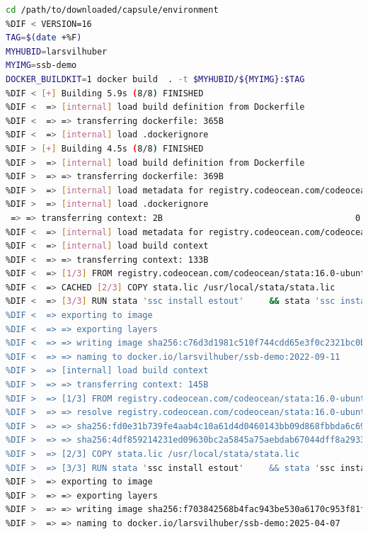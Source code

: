 \documentclass[inline]{hdsr} %
\providecommand{\DIFaddbegin}{} %
\providecommand{\DIFdelbegin}{} %
\providecommand{\DIFdelend}{} %
\providecommand{\DIFmodbegin}{} %
\begin{document}
\DIFdelbegin %
\DIFdelend \DIFaddbegin \DIFmodbegin
\begin{lstlisting}[language=bash,basicstyle=\footnotesize\color{NavyBlue}\ttfamily,caption={Building the container},float,label={code:build},alsolanguage=DIFcode]
cd /path/to/downloaded/capsule/environment
%DIF < VERSION=16
TAG=$(date +%F)
MYHUBID=larsvilhuber
MYIMG=ssb-demo
DOCKER_BUILDKIT=1 docker build  . -t $MYHUBID/${MYIMG}:$TAG
%DIF < [+] Building 5.9s (8/8) FINISHED                                                
%DIF <  => [internal] load build definition from Dockerfile                       0.0s
%DIF <  => => transferring dockerfile: 365B                                       0.0s
%DIF <  => [internal] load .dockerignore                                          0.0s
%DIF > [+] Building 4.5s (8/8) FINISHED                                   
%DIF >  => [internal] load build definition from Dockerfile                 0.1s
%DIF >  => => transferring dockerfile: 369B                                 0.0s
%DIF >  => [internal] load metadata for registry.codeocean.com/codeocean/s  1.1s
%DIF >  => [internal] load .dockerignore                                    0.1s
 => => transferring context: 2B                                      0.0s
%DIF <  => [internal] load metadata for registry.codeocean.com/codeocean/stata:1  0.0s
%DIF <  => [internal] load build context                                          0.0s
%DIF <  => => transferring context: 133B                                          0.0s
%DIF <  => [1/3] FROM registry.codeocean.com/codeocean/stata:16.0-ubuntu18.04     0.0s
%DIF <  => CACHED [2/3] COPY stata.lic /usr/local/stata/stata.lic                 0.0s
%DIF <  => [3/3] RUN stata 'ssc install estout'     && stata 'ssc install outreg  5.8s
%DIF <  => exporting to image                                                     0.0s 
%DIF <  => => exporting layers                                                    0.0s 
%DIF <  => => writing image sha256:c76d3d1981c510f744cdd65e3f0c2321bc0b7a99e5285  0.0s 
%DIF <  => => naming to docker.io/larsvilhuber/ssb-demo:2022-09-11                0.0s 
%DIF >  => [internal] load build context                                    0.1s
%DIF >  => => transferring context: 145B                                    0.0s
%DIF >  => [1/3] FROM registry.codeocean.com/codeocean/stata:16.0-ubuntu18  0.3s
%DIF >  => => resolve registry.codeocean.com/codeocean/stata:16.0-ubuntu18  0.0s
%DIF >  => => sha256:fd0e31b739fe4aab4c10a61d4d0460143bb09d868fbbda6c69848  0.0s
%DIF >  => => sha256:4df859214231ed09630bc2a5845a75aebdab67044dff8a2933b2e  0.0s
%DIF >  => [2/3] COPY stata.lic /usr/local/stata/stata.lic                  0.1s
%DIF >  => [3/3] RUN stata 'ssc install estout'     && stata 'ssc install   2.6s
%DIF >  => exporting to image                                               0.1s
%DIF >  => => exporting layers                                              0.1s
%DIF >  => => writing image sha256:f703842568b4fac943be530a6170c953f81fc29  0.0s
%DIF >  => => naming to docker.io/larsvilhuber/ssb-demo:2025-04-07          0.0s
\end{lstlisting}
\end{document}
